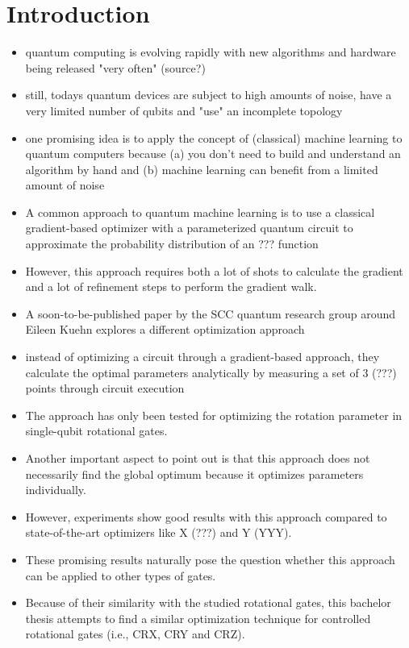 \chapter{Introduction}
\label{chap:introduction}


\begin{itemize}
    \item quantum computing is evolving rapidly with new algorithms and hardware being released "very often" (source?)
    \item still, todays quantum devices are subject to high amounts of noise, have a very limited number of qubits and "use" an incomplete topology
    \item one promising idea is to apply the concept of (classical) machine learning to quantum computers because (a) you don't need to build and understand an algorithm by hand and (b) machine learning can benefit from a limited amount of noise
    \item A common approach to quantum machine learning is to use a classical gradient-based optimizer with a parameterized quantum circuit to approximate the probability distribution of an ??? function
    \item However, this approach requires both a lot of shots to calculate the gradient and a lot of refinement steps to perform the gradient walk.
    \item A soon-to-be-published paper by the SCC quantum research group around Eileen Kuehn explores a different optimization approach
    \item instead of optimizing a circuit through a gradient-based approach, they calculate the optimal parameters analytically by measuring a set of 3 (???) points through circuit execution
    \item The approach has only been tested for optimizing the rotation parameter in single-qubit rotational gates.
    \item Another important aspect to point out is that this approach does not necessarily find the global optimum because it optimizes parameters individually.
    \item However, experiments show good results with this approach compared to state-of-the-art optimizers like X (???) and Y (YYY).
    \item These promising results naturally pose the question whether this approach can be applied to other types of gates.
    \item Because of their similarity with the studied rotational gates, this bachelor thesis attempts to find a similar optimization technique for controlled rotational gates (i.e., CRX, CRY and CRZ).
\end{itemize}
